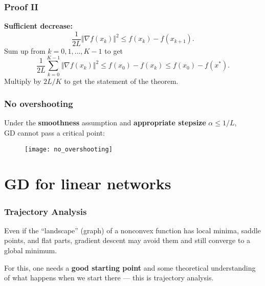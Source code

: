 \documentclass[aspectratio=149]{beamer}
\begin{document}
\begin{frame}
  \frametitle{Proof II}
  \textbf{Sufficient decrease:}
  \begin{equation}
    \frac{1}{2L} \Vert \nabla f(x_k) \Vert^2 \le f(x_k) - f(x_{k+1}).
  \end{equation}
  Sum up from $k=0, 1, \dots, K-1$ to get
  \begin{equation}
      \frac{1}{2L}\sum_{k=0}^{K-1} \Vert \nabla f(x_k) \Vert^2 \le f(x_0) - f(x_{k}) \le f(x_0) - f(x^*).
  \end{equation}
  Multiply by $2L/K$ to get the statement of the theorem.\qedhere
\end{frame}


\begin{frame}
  \frametitle{No overshooting}
  Under the \textbf{smoothness} assumption and \textbf{appropriate stepsize} $\alpha \le 1/L$,\\
  GD cannot pass a critical point:
  \begin{figure}[ht]
    \centering
    \texttt{[image: no\_overshooting]}
  \end{figure}
\end{frame}


\section{GD for linear networks}%
\label{sec:}

\begin{frame}
  \frametitle{Trajectory Analysis}

  Even if the ``landscape'' (graph) of a nonconvex function has local minima, saddle
  points, and flat parts, gradient descent may avoid them and still converge to a global
  minimum.\medskip


  For this, one needs a \textbf{good starting point} and some theoretical understanding of what
  happens when we start there — this is trajectory analysis.

\end{frame}
\end{document}
